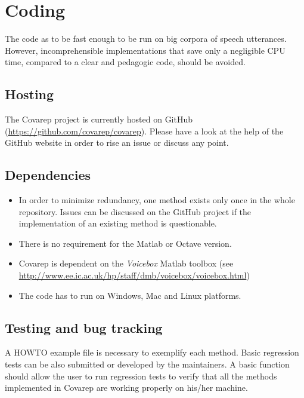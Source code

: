 \documentclass{article}
\begin{document}
\newpage

\section{Coding}

    The code as to be fast enough to be run on big corpora of speech utterances.
    However, incomprehensible implementations that save only a negligible CPU time, compared to a clear and pedagogic code, should be avoided.

    \subsection{Hosting}
    The Covarep project is currently hosted on GitHub (\url{https://github.com/covarep/covarep}).
    Please have a look at the help of the GitHub website in order to rise an issue or discuss any point.

    \subsection{Dependencies}
    \begin{itemize}
    \item In order to minimize redundancy, one method exists only once in the whole repository. Issues can be discussed on the GitHub project if the implementation of an existing method is questionable.
    \item There is no requirement for the Matlab or Octave version.
    \item Covarep is dependent on the \textit{Voicebox} Matlab toolbox (see \url{http://www.ee.ic.ac.uk/hp/staff/dmb/voicebox/voicebox.html})
    \item The code has to run on Windows, Mac and Linux platforms.
    \end{itemize}

    \subsection{Testing and bug tracking}
    A HOWTO example file is necessary to exemplify each method.
    Basic regression tests can be also submitted or developed by the maintainers.
    A basic function should allow the user to run regression tests to verify that all the methods implemented in Covarep are working properly on his/her machine.
\end{document}
